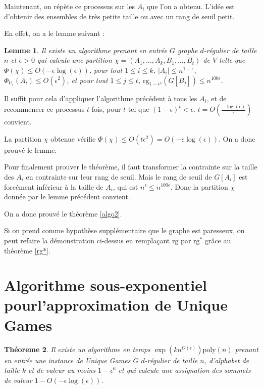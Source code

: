 \documentclass[a4paper,10pt]{article}
\theoremstyle{plain}
\newtheorem{theo}{Théoreme}
\newtheorem{lem}[theo]{Lemme}
\theoremstyle{Definition}
\theoremstyle{remark}
\newcommand{\rg}{\mathrm{rg}}
\newcommand{\poly}{\mathrm{poly}}
\begin{document}
\vspace{0.5cm}

Maintenant, on répète ce processus sur les $A_i$ que l'on a obtenu. L'idée
est d'obtenir des ensembles de très petite taille ou avec un rang de seuil
petit.

En effet, on a le lemme suivant :

\begin{lem}
Il existe un algorithme prenant en entrée $G$ graphe $d$-régulier de taille
$n$ et $\epsilon > 0$ qui calcule une partition $\chi =
(A_1,\dots,A_k,B_1,\dots,B_t)$ de $V$ telle que $\Phi(\chi) \leq O(-
\epsilon \log(\epsilon))$, pour tout $1\leq i \leq k$, $|A_i| \leq n^{1 -
  \epsilon}$, $\Phi_{U_i}(A_i) \leq O(\epsilon^2)$, et pour tout $1\leq j
\leq t$, $\rg_{1- \epsilon^5}(G[B_j]) \leq n^{100 \epsilon}$.
\end{lem}

Il suffit pour cela d'appliquer l'algorithme précédent à tous les $A_i$, et
de recommencer ce processus $t$ fois, pour $t$ tel que $(1- \epsilon)^t <
\epsilon$. $t = O(\frac{ -\log(\epsilon)}{\epsilon})$ convient.

La partition $\chi$ obtenue vérifie $\Phi(\chi) \leq O(t \epsilon^2) = O (-
\epsilon \log(\epsilon))$. On a donc prouvé le lemme.

\vspace{0.5cm}

Pour finalement prouver le théorème, il faut transformer la contrainte sur
la taille des $A_i$ en contrainte sur leur rang de seuil. Mais le rang de
seuil de $G[A_i]$ est forcément inférieur à la taille de $A_i$, qui est
$n^{\epsilon} \leq n^{100 \epsilon}$. Donc la partition $\chi$ donnée par
le lemme précédent convient.

On a donc prouvé le théorème \ref{algo2}.

\vspace{1cm}

Si on prend comme hypothèse supplémentaire que le graphe est paresseux, on
peut refaire la démonstration ci-dessus en remplaçant $\rg$ par $\rg^*$
grâce au théorème \ref{rg*}.

\section{Algorithme sous-exponentiel pourl'approximation de Unique Games}

\begin{theo}
Il existe un algorithme en temps $\exp(kn^{O(\epsilon)})\poly(n)$ prenant
en entrée une instance de Unique Games $G$ $d$-régulier de taille $n$,
d'alphabet de taille $k$ et de valeur au moins $1 - \epsilon^6$ et qui
calcule une assignation des sommets de valeur $1 - O(- \epsilon
\log(\epsilon))$.
\end{theo}
\end{document}
